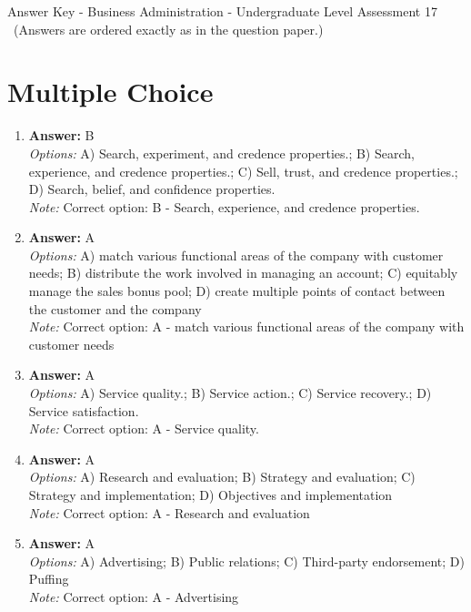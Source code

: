 \documentclass[12pt]{article}
\begin{document}
\begin{center}
Answer Key - Business Administration - Undergraduate Level Assessment 17 \
\small (Answers are ordered exactly as in the question paper.)
\end{center}

\section*{Multiple Choice}
\begin{enumerate}[label=\arabic*.]
\item \textbf{Answer:} B
\\ \textit{Options:} A) Search, experiment, and credence properties.; B) Search, experience, and credence properties.; C) Sell, trust, and credence properties.; D) Search, belief, and confidence properties.
\\ \textit{Note:} Correct option: B - Search, experience, and credence properties.
\item \textbf{Answer:} A
\\ \textit{Options:} A) match various functional areas of the company with customer needs; B) distribute the work involved in managing an account; C) equitably manage the sales bonus pool; D) create multiple points of contact between the customer and the company
\\ \textit{Note:} Correct option: A - match various functional areas of the company with customer needs
\item \textbf{Answer:} A
\\ \textit{Options:} A) Service quality.; B) Service action.; C) Service recovery.; D) Service satisfaction.
\\ \textit{Note:} Correct option: A - Service quality.
\item \textbf{Answer:} A
\\ \textit{Options:} A) Research and evaluation; B) Strategy and evaluation; C) Strategy and implementation; D) Objectives and implementation
\\ \textit{Note:} Correct option: A - Research and evaluation
\item \textbf{Answer:} A
\\ \textit{Options:} A) Advertising; B) Public relations; C) Third-party endorsement; D) Puffing
\\ \textit{Note:} Correct option: A - Advertising
\end{enumerate}
\end{document}
